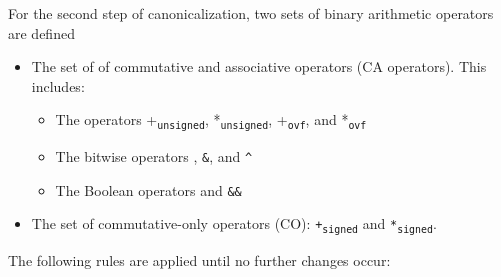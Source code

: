 For the second step of canonicalization, two sets of binary arithmetic
operators are defined

\begin{itemize}
\item
  The set of of commutative and associative operators (CA operators).
  This includes:

  \begin{itemize}
  \item
    The operators +\texttt{\textsubscript{unsigned}},
    *\texttt{\textsubscript{unsigned}}, +\texttt{\textsubscript{ovf}},
    and *\texttt{\textsubscript{ovf}}
  \item
    The bitwise operators \texttt{\textbar{}}, \texttt{\&}, and
    \texttt{\^{}}
  \item
    The Boolean operators \texttt{\textbar{}\textbar{}} and
    \texttt{\&\&}
  \end{itemize}
\item
  The set of commutative-only operators (CO):
  \texttt{+\textsubscript{signed}} and \texttt{*\textsubscript{signed}}.
\end{itemize}

The following rules are applied until no further changes occur:

